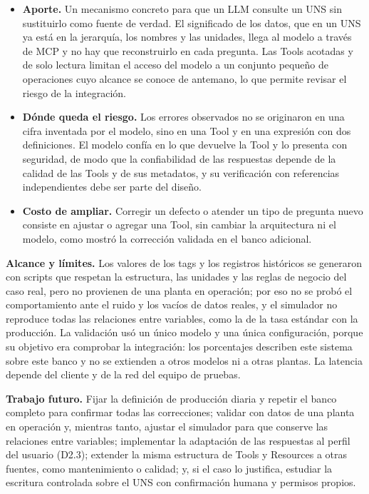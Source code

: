 \documentclass[11pt,letterpaper]{article}
\begin{document}
\begin{itemize}
\item \textbf{Aporte.} Un mecanismo concreto para que un LLM consulte un UNS sin sustituirlo como fuente de verdad. El significado de los datos, que en un UNS ya está en la jerarquía, los nombres y las unidades, llega al modelo a través de MCP y no hay que reconstruirlo en cada pregunta. Las Tools acotadas y de solo lectura limitan el acceso del modelo a un conjunto pequeño de operaciones cuyo alcance se conoce de antemano, lo que permite revisar el riesgo de la integración.
\item \textbf{Dónde queda el riesgo.} Los errores observados no se originaron en una cifra inventada por el modelo, sino en una Tool y en una expresión con dos definiciones. El modelo confía en lo que devuelve la Tool y lo presenta con seguridad, de modo que la confiabilidad de las respuestas depende de la calidad de las Tools y de sus metadatos, y su verificación con referencias independientes debe ser parte del diseño.
\item \textbf{Costo de ampliar.} Corregir un defecto o atender un tipo de pregunta nuevo consiste en ajustar o agregar una Tool, sin cambiar la arquitectura ni el modelo, como mostró la corrección validada en el banco adicional.
\end{itemize}

\textbf{Alcance y límites.} Los valores de los tags y los registros históricos se generaron con scripts que respetan la estructura, las unidades y las reglas de negocio del caso real, pero no provienen de una planta en operación; por eso no se probó el comportamiento ante el ruido y los vacíos de datos reales, y el simulador no reproduce todas las relaciones entre variables, como la de la tasa estándar con la producción. La validación usó un único modelo y una única configuración, porque su objetivo era comprobar la integración: los porcentajes describen este sistema sobre este banco y no se extienden a otros modelos ni a otras plantas. La latencia depende del cliente y de la red del equipo de pruebas.

\textbf{Trabajo futuro.} Fijar la definición de producción diaria y repetir el banco completo para confirmar todas las correcciones; validar con datos de una planta en operación y, mientras tanto, ajustar el simulador para que conserve las relaciones entre variables; implementar la adaptación de las respuestas al perfil del usuario (D2.3); extender la misma estructura de Tools y Resources a otras fuentes, como mantenimiento o calidad; y, si el caso lo justifica, estudiar la escritura controlada sobre el UNS con confirmación humana y permisos propios.
\end{document}
